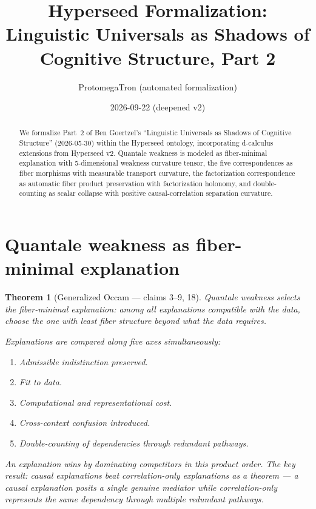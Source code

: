\documentclass[11pt,a4paper]{article}
\title{Hyperseed Formalization:\\
  Linguistic Universals as Shadows of Cognitive Structure, Part 2}
\author{ProtomegaTron (automated formalization)}
\date{2026-09-22 (deepened v2)}
\newtheorem{theorem}[definition]{Theorem}
\begin{document}
\maketitle

\begin{abstract}
We formalize Part~2 of Ben Goertzel's ``Linguistic Universals as Shadows
of Cognitive Structure'' (2026-05-30) within the Hyperseed ontology,
incorporating d-calculus extensions from Hyperseed v2. Quantale weakness
is modeled as fiber-minimal explanation with 5-dimensional weakness
curvature tensor, the five correspondences as fiber morphisms with
measurable transport curvature, the factorization correspondence as
automatic fiber product preservation with factorization holonomy, and
double-counting as scalar collapse with positive causal-correlation
separation curvature.
\end{abstract}

\tableofcontents

\section{Quantale weakness as fiber-minimal explanation}

\begin{theorem}[Generalized Occam --- claims 3--9, 18]
\label{thm:weakness}
\emph{Quantale weakness} selects the fiber-minimal explanation:
among all explanations compatible with the data, choose the one with
least fiber structure beyond what the data requires.

Explanations are compared along five axes simultaneously:
\begin{enumerate}
  \item Admissible indistinction preserved.
  \item Fit to data.
  \item Computational and representational cost.
  \item Cross-context confusion introduced.
  \item Double-counting of dependencies through redundant pathways.
\end{enumerate}

An explanation wins by dominating competitors in this product order.
The key result: causal explanations beat correlation-only explanations
as a theorem --- a causal explanation posits a single genuine mediator
while correlation-only represents the same dependency through multiple
redundant pathways.
\end{theorem}
\end{document}
